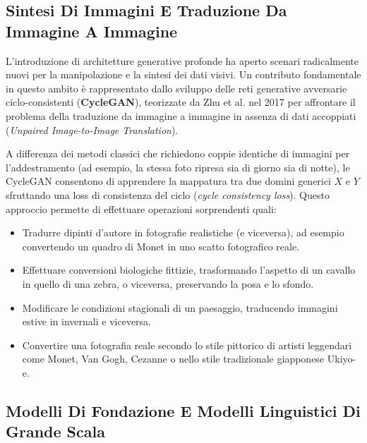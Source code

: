 ﻿\documentclass[11pt, a4paper]{article}
\begin{document}
\newpage

\subsection{Sintesi Di Immagini E Traduzione Da Immagine A Immagine}

L'introduzione di architetture generative profonde ha aperto scenari radicalmente nuovi per la manipolazione e la sintesi dei dati visivi. Un contributo fondamentale in questo ambito è rappresentato dallo sviluppo delle reti generative avversarie ciclo-consistenti (\textbf{CycleGAN}), teorizzate da Zhu et al. nel 2017 per affrontare il problema della traduzione da immagine a immagine in assenza di dati accoppiati (\emph{Unpaired Image-to-Image Translation}).

A differenza dei metodi classici che richiedono coppie identiche di immagini per l'addestramento (ad esempio, la stessa foto ripresa sia di giorno sia di notte), le CycleGAN consentono di apprendere la mappatura tra due domini generici $X$ e $Y$ sfruttando una loss di consistenza del ciclo (\emph{cycle consistency loss}). Questo approccio permette di effettuare operazioni sorprendenti quali:
\begin{itemize}[noitemsep]
    \item Tradurre dipinti d'autore in fotografie realistiche (e viceversa), ad esempio convertendo un quadro di Monet in uno scatto fotografico reale.
    \item Effettuare conversioni biologiche fittizie, trasformando l'aspetto di un cavallo in quello di una zebra, o viceversa, preservando la posa e lo sfondo.
    \item Modificare le condizioni stagionali di un paesaggio, traducendo immagini estive in invernali e viceversa.
    \item Convertire una fotografia reale secondo lo stile pittorico di artisti leggendari come Monet, Van Gogh, Cezanne o nello stile tradizionale giapponese Ukiyo-e.
\end{itemize}


\subsection{Modelli Di Fondazione E Modelli Linguistici Di Grande Scala}
\end{document}
